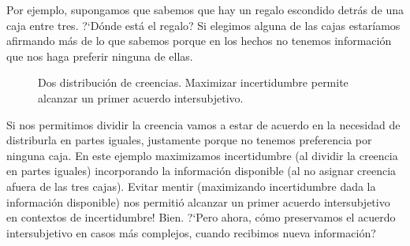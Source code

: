 \documentclass[a4paper,11pt]{book}
\theoremstyle{definition}
\newif\ifen
\newif\ifes
\newcommand{\En}[1]{\ifen#1\fi}
\newcommand{\Es}[1]{\ifes#1\fi}
\begin{document}
Por ejemplo, supongamos que sabemos que hay un regalo escondido detr\'as de una caja entre tres.
%
?`D\'onde est\'a el regalo?
%
Si elegimos alguna de las cajas estar\'iamos afirmando m\'as de lo que sabemos porque en los hechos no tenemos informaci\'on que nos haga preferir ninguna de ellas.
\begin{figure}[ht!]
 \centering
 \begin{subfigure}[b]{0.48\textwidth}
 \centering
    \caption{\En{Full certainty}}
    \label{fig:preferencia_parcial_2}
 \end{subfigure}
 \begin{subfigure}[b]{0.48\textwidth}
 \centering
    \caption{\En{Maximum uncertainty}}
    \label{fig:preferencia_total_2}
 \end{subfigure}
\caption{
Dos distribuci\'on de creencias. Maximizar incertidumbre permite alcanzar un primer acuerdo intersubjetivo.
}
 \label{fig:distribucion_de_creencias_2}
\end{figure}
\noindent
%
Si nos permitimos dividir la creencia vamos a estar de acuerdo en la necesidad de distriburla en partes iguales, justamente porque no tenemos preferencia por ninguna caja.
%
En este ejemplo maximizamos incertidumbre (al dividir la creencia en partes iguales) incorporando la informaci\'on disponible (al no asignar creencia afuera de las tres cajas).
%
Evitar mentir (maximizando incertidumbre dada la informaci\'on disponible) nos permiti\'o alcanzar un primer acuerdo intersubjetivo en contextos de incertidumbre!
%
Bien. ?`Pero ahora, c\'omo preservamos el acuerdo intersubjetivo en casos m\'as complejos, cuando recibimos nueva informaci\'on?
\end{document}
